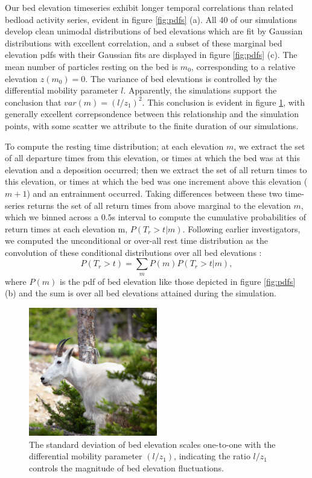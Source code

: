 \documentclass[draft]{agujournal2018}
\newcommand\be{\begin{equation}} %
\newcommand\ee{\end{equation}}   %
\begin{document}
Our bed elevation timeseries exhibit longer temporal correlations than related bedload activity series, evident in figure \ref{fig:pdfs} (a). 
All 40 of our simulations develop clean unimodal distributions of bed elevations which are fit by Gaussian distributions with excellent correlation, and a subset of these marginal bed elevation pdfs with their Gaussian fits are displayed in figure \ref{fig:pdfs} (c). 
The mean number of particles resting on the bed is $m_0$, corresponding to a relative elevation $z(m_0)=0$. 
The variance of bed elevations is controlled by the differential mobility parameter $l$. 
Apparently, the simulations support the conclusion that $var(m) = (l/z_1)^2$. 
This conclusion is evident in figure \ref{fig:var}, with generally excellent correpsondence between this relationship and the simulation points, with some scatter we attribute to the finite duration of our simulations.

To compute the resting time distribution; at each elevation $m$, we extract the set of all departure times from this elevation, or times at which the bed was at this elevation and a deposition occurred; then we extract the set of all return times to this elevation, or times at which the bed was one increment above this elevation ($m+1$) and an entrainment occurred.
Taking differences between these two time-series returns the set of all return times from above marginal to the elevation $m$, which we binned across a $0.5$s interval to compute the cumulative probabilities of return times at each elevation m, $P(T_r>t|m)$.
Following earlier investigators, we computed the unconditional or over-all rest time distribution as the convolution of these conditional distributions over all bed elevations \citep[e.g.][]{Yang1971, Voepel2013}:
\be P(T_r>t) = \sum_m P(m) P(T_r > t| m), \ee
where $P(m)$ is the pdf of bed elevation like those depicted in figure \ref{fig:pdfs} (b) and the sum is over all bed elevations attained during the simulation. 

\begin{figure}
\centering
\includegraphics[width=0.5\textwidth,keepaspectratio]{squaredummy}
\caption{The standard deviation of bed elevation scales one-to-one with the differential mobility parameter $(l/z_1)$, indicating the ratio $l/z_1$ controls the magnitude of bed elevation fluctuations. }
\label{fig:var}
\end{figure}
\end{document}
